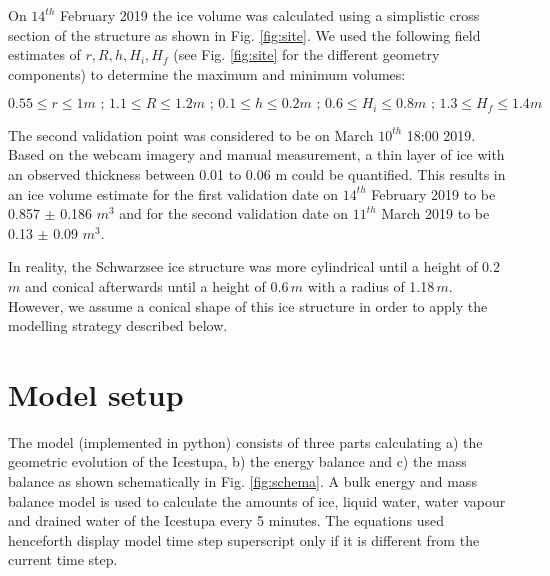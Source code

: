 \documentclass[utf8]{frontiersSCNS} %
\begin{document}
On $14^{th}$ February 2019 the ice volume was calculated using a simplistic cross section of the structure as shown in Fig.
\ref{fig:site}. We used the following field estimates of $r, R, h, H_i, H_f$ (see Fig. \ref{fig:site} for the
different geometry components) to determine the maximum and minimum volumes:

\begin{equation} 0.55\leq r\leq 1 m\textit{ ; }1.1\leq R\leq 1.2 m\textit{ ; }0.1\leq h\leq 0.2 m\textit{ ; }0.6\leq
H_i\leq 0.8 m\textit{ ; }1.3\leq H_f\leq 1.4 m \end{equation}

The second validation point was considered to be on March $10^{th}$ 18:00 2019.  Based on the webcam imagery and manual
measurement, a thin layer of ice with an observed thickness between 0.01 to 0.06 m could be quantified. This results in
an ice volume estimate for the first validation date on $14^{th}$ February 2019 to be 0.857 $\pm$ 0.186 $m^{3}$ and for
the second validation date on $11^{th}$ March 2019 to be 0.13 $\pm$ 0.09 $m^{3}$.

In reality, the Schwarzsee ice structure was more cylindrical until a height of 0.2\,$m$ and conical afterwards until a
height of 0.6\,$m$ with a radius of 1.18\,$m$. However, we assume a conical shape of this ice structure in order to
apply the modelling strategy described below.

\section{Model setup}

The model (implemented in python) consists of three parts calculating a) the geometric evolution of the Icestupa, b)
the energy balance and c) the mass balance as shown schematically in Fig. \ref{fig:schema}. A bulk energy and mass
balance model is used to calculate the amounts of ice, liquid water, water vapour and drained water of the Icestupa
every 5 minutes. The equations used henceforth display model time step superscript only if it is different from the
current time step.
\end{document}
